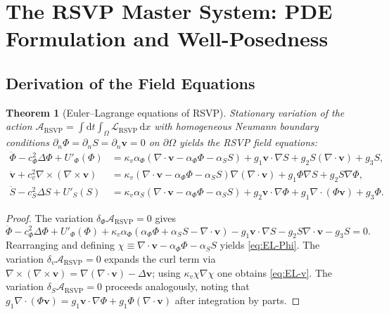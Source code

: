 \documentclass[12pt, a4paper]{article}
\theoremstyle{plain}
\newtheorem{theorem}{Theorem}[section]
\theoremstyle{definition}
\theoremstyle{remark}
\newcommand{\vfield}{\mathbf{v}}
\newcommand{\LRSVP}{\mathcal{L}_{\mathrm{RSVP}}}
\newcommand{\ARSVP}{\mathcal{A}_{\mathrm{RSVP}}}
\newcommand{\divv}{\nabla\!\cdot\!\vfield}
\begin{document}
\section{The RSVP Master System: PDE Formulation and Well-Posedness}
\label{sec:master}

\subsection{Derivation of the Field Equations}

\begin{theorem}[Euler--Lagrange equations of RSVP]
\label{thm:EL}
Stationary variation of the action $\ARSVP = \int \mathrm{d}t\int_\Omega \LRSVP\,\mathrm{d}x$
with homogeneous Neumann boundary conditions $\partial_n\Phi = \partial_n S = \partial_n\vfield = 0$
on $\partial\Omega$ yields the RSVP field equations:
\begin{align}
\ddot{\Phi} - c_\Phi^2\Delta\Phi + U'_\Phi(\Phi)
  &= \kappa_v\alpha_\Phi(\divv - \alpha_\Phi\Phi - \alpha_S S)
    + g_1\vfield\cdot\nabla S + g_2 S(\divv) + g_3 S,
\label{eq:EL-Phi}\\
\ddot{\vfield} + c_v^2\nabla\!\times\!(\nabla\!\times\!\vfield)
  &= \kappa_v(\divv - \alpha_\Phi\Phi - \alpha_S S)\nabla(\divv)
    + g_1\Phi\nabla S + g_2 S\nabla\Phi,
\label{eq:EL-v}\\
\ddot{S} - c_S^2\Delta S + U'_S(S)
  &= \kappa_v\alpha_S(\divv - \alpha_\Phi\Phi - \alpha_S S)
    + g_2\vfield\cdot\nabla\Phi + g_1\nabla\cdot(\Phi\vfield) + g_3\Phi.
\label{eq:EL-S}
\end{align}
\end{theorem}

\begin{proof}
The variation $\delta_\Phi\ARSVP = 0$ gives
\[
\ddot{\Phi} - c_\Phi^2\Delta\Phi + U'_\Phi(\Phi)
+ \kappa_v\alpha_\Phi(\alpha_\Phi\Phi + \alpha_S S - \divv)
- g_1\vfield\cdot\nabla S - g_2 S\nabla\cdot\vfield - g_3 S = 0.
\]
Rearranging and defining $\chi \equiv \divv - \alpha_\Phi\Phi - \alpha_S S$ yields
\eqref{eq:EL-Phi}.  The variation $\delta_v\ARSVP = 0$ expands the curl term via
$\nabla\times(\nabla\times\vfield) = \nabla(\divv) - \Delta\vfield$; using $\kappa_v\chi\nabla\chi$ one
obtains \eqref{eq:EL-v}.  The variation $\delta_S\ARSVP = 0$ proceeds analogously,
noting that $g_1\nabla\cdot(\Phi\vfield) = g_1\vfield\cdot\nabla\Phi + g_1\Phi(\divv)$
after integration by parts.
\end{proof}
\end{document}
